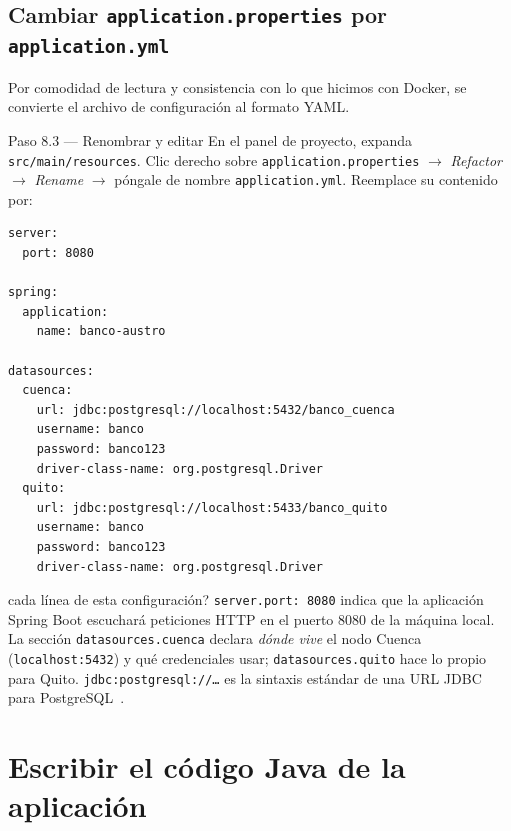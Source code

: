 \documentclass[11pt,a4paper]{article}
\begin{document}
\subsection{Cambiar \texttt{application.properties} por \texttt{application.yml}}

Por comodidad de lectura y consistencia con lo que hicimos con Docker, se convierte el archivo de configuraci\'on al formato YAML.

\begin{pasobox}{Paso 8.3 --- Renombrar y editar}
En el panel de proyecto, expanda \texttt{src/main/resources}. Clic derecho sobre \texttt{application.properties} $\rightarrow$ \emph{Refactor} $\rightarrow$ \emph{Rename} $\rightarrow$ p\'ongale de nombre \texttt{application.yml}. Reemplace su contenido por:

\begin{lstlisting}[style=yamlstyle,caption={src/main/resources/application.yml}]
server:
  port: 8080

spring:
  application:
    name: banco-austro

datasources:
  cuenca:
    url: jdbc:postgresql://localhost:5432/banco_cuenca
    username: banco
    password: banco123
    driver-class-name: org.postgresql.Driver
  quito:
    url: jdbc:postgresql://localhost:5433/banco_quito
    username: banco
    password: banco123
    driver-class-name: org.postgresql.Driver
\end{lstlisting}
\end{pasobox}

\begin{conceptobox}{cada l\'inea de esta configuraci\'on?}
\texttt{server.port: 8080} indica que la aplicaci\'on Spring Boot escuchar\'a peticiones HTTP en el puerto 8080 de la m\'aquina local. La secci\'on \texttt{datasources.cuenca} declara \emph{d\'onde vive} el nodo Cuenca (\texttt{localhost:5432}) y qu\'e credenciales usar; \texttt{datasources.quito} hace lo propio para Quito. \texttt{jdbc:postgresql://\ldots} es la sintaxis est\'andar de una URL JDBC para PostgreSQL~\cite{PostgreSQL16Docs}.
\end{conceptobox}

\clearpage
\section{Escribir el c\'odigo Java de la aplicaci\'on}
\end{document}

